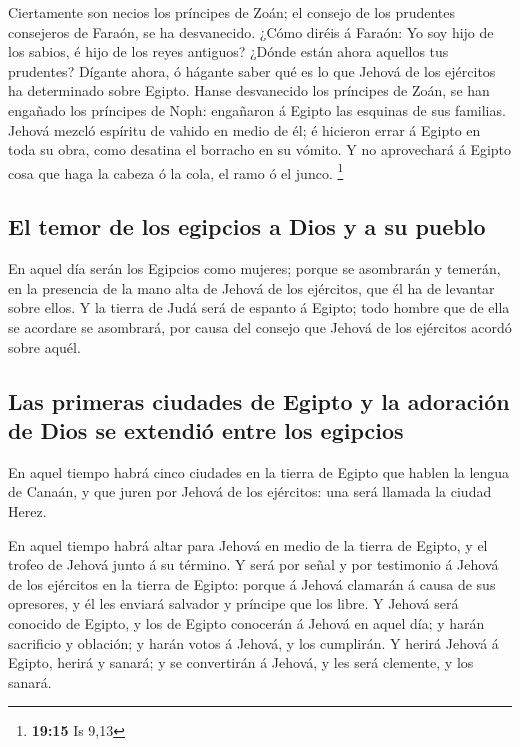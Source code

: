  Ciertamente son necios los príncipes de Zoán; el consejo
de los prudentes consejeros de Faraón, se ha desvanecido. ¿Cómo diréis á
Faraón: Yo soy hijo de los sabios, é hijo de los reyes antiguos?
 ¿Dónde están ahora aquellos tus prudentes? Dígante
ahora, ó hágante saber qué es lo que Jehová de los ejércitos ha
determinado sobre Egipto.  Hanse desvanecido los
príncipes de Zoán, se han engañado los príncipes de Noph: engañaron á
Egipto las esquinas de sus familias.  Jehová mezcló
espíritu de vahido en medio de él; é hicieron errar á Egipto en toda su
obra, como desatina el borracho en su vómito.  Y no
aprovechará á Egipto cosa que haga la cabeza ó la cola, el ramo ó el
junco. \footnote{\textbf{19:15} Is 9,13}

\hypertarget{el-temor-de-los-egipcios-a-dios-y-a-su-pueblo}{%
\subsection{El temor de los egipcios a Dios y a su
pueblo}\label{el-temor-de-los-egipcios-a-dios-y-a-su-pueblo}}

 En aquel día serán los Egipcios como mujeres; porque se
asombrarán y temerán, en la presencia de la mano alta de Jehová de los
ejércitos, que él ha de levantar sobre ellos.  Y la
tierra de Judá será de espanto á Egipto; todo hombre que de ella se
acordare se asombrará, por causa del consejo que Jehová de los ejércitos
acordó sobre aquél.

\hypertarget{las-primeras-ciudades-de-egipto-y-la-adoraciuxf3n-de-dios-se-extendiuxf3-entre-los-egipcios}{%
\subsection{Las primeras ciudades de Egipto y la adoración de Dios se
extendió entre los
egipcios}\label{las-primeras-ciudades-de-egipto-y-la-adoraciuxf3n-de-dios-se-extendiuxf3-entre-los-egipcios}}

 En aquel tiempo habrá cinco ciudades en la tierra de
Egipto que hablen la lengua de Canaán, y que juren por Jehová de los
ejércitos: una será llamada la ciudad Herez.

 En aquel tiempo habrá altar para Jehová en medio de la
tierra de Egipto, y el trofeo de Jehová junto á su término.
 Y será por señal y por testimonio á Jehová de los
ejércitos en la tierra de Egipto: porque á Jehová clamarán á causa de
sus opresores, y él les enviará salvador y príncipe que los libre.
 Y Jehová será conocido de Egipto, y los de Egipto
conocerán á Jehová en aquel día; y harán sacrificio y oblación; y harán
votos á Jehová, y los cumplirán.  Y herirá Jehová á
Egipto, herirá y sanará; y se convertirán á Jehová, y les será clemente,
y los sanará.

